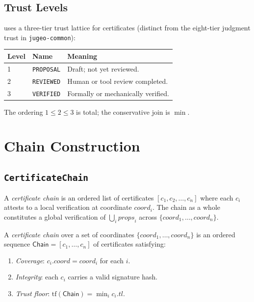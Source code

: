\documentclass[11pt]{article}
\newcommand{\Chain}{\mathsf{Chain}}            %
\newcommand{\certcoord}{\mathit{coord}}        %
\newcommand{\certprops}{\mathit{props}}        %
\newcommand{\certtrust}{\mathit{tl}}           %
\begin{document}
\subsection{Trust Levels}

\JuGeo{} uses a three-tier trust lattice for certificates (distinct from
the eight-tier judgment trust in \texttt{jugeo-common}):

\begin{center}
\begin{tabular}{lll}
\toprule
\textbf{Level} & \textbf{Name} & \textbf{Meaning} \\
\midrule
1 & \texttt{PROPOSAL}  & Draft; not yet reviewed. \\
2 & \texttt{REVIEWED}  & Human or tool review completed. \\
3 & \texttt{VERIFIED}  & Formally or mechanically verified. \\
\bottomrule
\end{tabular}
\end{center}

The ordering $1 \le 2 \le 3$ is total; the conservative join is $\min$.

\section{Chain Construction}\label{sec:chain}

\subsection{\texttt{CertificateChain}}

A \emph{certificate chain} is an ordered list of certificates
$[c_1, c_2, \ldots, c_n]$ where each $c_i$ attests to a local
verification at coordinate $\certcoord_i$.  The chain as a whole
constitutes a global verification of $\bigcup_i \certprops_i$ across
$\{\certcoord_1, \ldots, \certcoord_n\}$.

\begin{definition}\label{def:chain}
A \emph{certificate chain} over a set of coordinates
$\{\certcoord_1, \ldots, \certcoord_n\}$ is an ordered sequence
$\Chain = [c_1, \ldots, c_n]$ of certificates satisfying:
\begin{enumerate}
  \item \emph{Coverage}: $c_i.\certcoord = \certcoord_i$ for each $i$.
  \item \emph{Integrity}: each $c_i$ carries a valid signature hash.
  \item \emph{Trust floor}: $\mathrm{tf}(\Chain) = \min_{i} c_i.\certtrust$.
\end{enumerate}
\end{definition}
\end{document}
